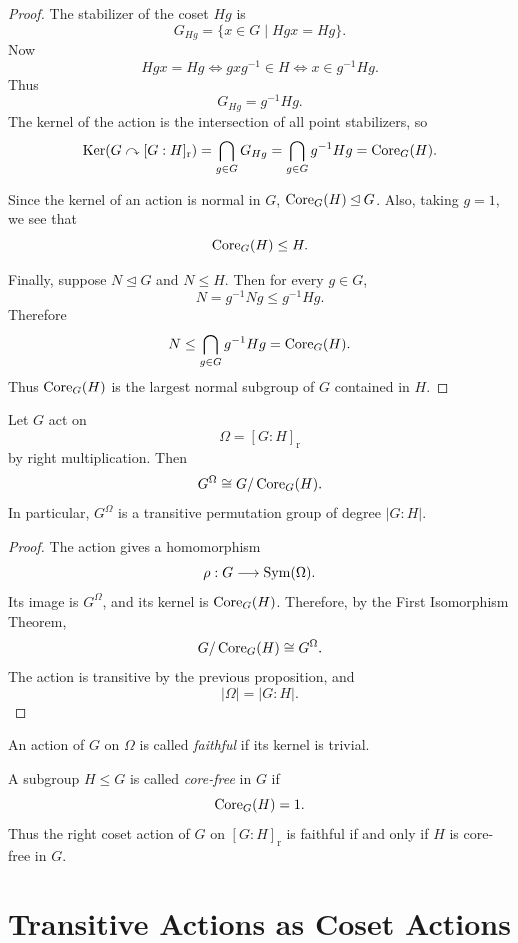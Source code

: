 \begin{proof}
The stabilizer of the coset \(Hg\) is
\[
    G_{Hg}
    =
    \{x\in G\mid Hgx=Hg\}.
\]
Now
\[
    Hgx=Hg
    \iff
    gxg^{-1}\in H
    \iff
    x\in g^{-1}Hg.
\]
Thus
\[
    G_{Hg}=g^{-1}Hg.
\]
The kernel of the action is the intersection of all point stabilizers, so
\[
    \operatorname{Ker}(G\curvearrowright [G:H]_{\mathrm r})
    =
    \bigcap_{g\in G}G_{Hg}
    =
    \bigcap_{g\in G}g^{-1}Hg
    =
    \operatorname{Core}_G(H).
\]

Since the kernel of an action is normal in \(G\), \(\operatorname{Core}_G(H)\unlhd G\). Also, taking \(g=1\), we see that
\[
    \operatorname{Core}_G(H)\leq H.
\]

Finally, suppose \(N\unlhd G\) and \(N\leq H\). Then for every \(g\in G\),
\[
    N=g^{-1}Ng\leq g^{-1}Hg.
\]
Therefore
\[
    N\leq \bigcap_{g\in G}g^{-1}Hg=\operatorname{Core}_G(H).
\]
Thus \(\operatorname{Core}_G(H)\) is the largest normal subgroup of \(G\) contained in \(H\).
\end{proof}

\begin{proposition}
Let \(G\) act on
\[
    \Omega=[G:H]_{\mathrm r}
\]
by right multiplication. Then
\[
    G^\Omega \cong G/\operatorname{Core}_G(H).
\]
In particular, \(G^\Omega\) is a transitive permutation group of degree \(|G:H|\).
\end{proposition}

\begin{proof}
The action gives a homomorphism
\[
    \rho:G\longrightarrow \operatorname{Sym}(\Omega).
\]
Its image is \(G^\Omega\), and its kernel is \(\operatorname{Core}_G(H)\). Therefore, by the First Isomorphism Theorem,
\[
    G/\operatorname{Core}_G(H)\cong G^\Omega.
\]
The action is transitive by the previous proposition, and
\[
    |\Omega|=|G:H|.
\]
\end{proof}

\begin{definition}
An action of \(G\) on \(\Omega\) is called \emph{faithful} if its kernel is trivial.

A subgroup \(H\leq G\) is called \emph{core-free} in \(G\) if
\[
    \operatorname{Core}_G(H)=1.
\]
Thus the right coset action of \(G\) on \([G:H]_{\mathrm r}\) is faithful if and only if \(H\) is core-free in \(G\).
\end{definition}

\section{Transitive Actions as Coset Actions}

